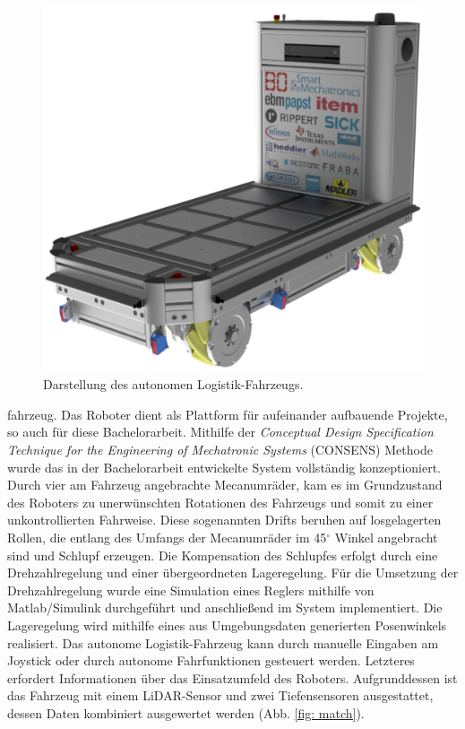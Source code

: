 \documentclass[12pt,a4paper,oneside,numbers=noenddot,headsepline,captions=tableheading,toc=bibliography,openany,tikz,margin=5mm]{scrbook}
\begin{document}
\begin{titlepage}
\begin{figure}
	\includegraphics[width=0.5\columnwidth]{alf2}
	\caption{Darstellung des autonomen Logistik-Fahrzeugs.}
	\label{fig: alf}
\end{figure}

 fahrzeug. Das Roboter dient als Plattform für aufeinander aufbauende Projekte, so auch für diese Bachelorarbeit. Mithilfe der \textit{Conceptual Design Specification Technique for the Engineering of Mechatronic Systems} (CONSENS) Methode wurde das in der Bachelorarbeit entwickelte System vollständig konzeptioniert. Durch vier am Fahrzeug angebrachte Mecanumräder, kam es im Grundzustand des Roboters zu unerwünschten Rotationen des Fahrzeugs und somit zu einer unkontrollierten Fahrweise. Diese sogenannten Drifts beruhen auf losgelagerten Rollen, die entlang des Umfangs der Mecanumräder im 45$^\circ$ Winkel angebracht sind und Schlupf erzeugen. Die Kompensation des Schlupfes erfolgt durch eine Drehzahlregelung und einer übergeordneten Lageregelung. Für die Umsetzung der Drehzahlregelung wurde eine Simulation eines Reglers mithilfe von Matlab/Simulink durchgeführt und anschließend im System implementiert. Die Lageregelung wird mithilfe eines aus Umgebungsdaten generierten Posenwinkels realisiert. Das autonome Logistik-Fahrzeug kann durch manuelle Eingaben am Joystick oder durch autonome Fahrfunktionen gesteuert werden. Letzteres erfordert Informationen über das Einsatzumfeld des Roboters. Aufgrunddessen ist das Fahrzeug mit einem LiDAR-Sensor und zwei Tiefensensoren ausgestattet, dessen Daten kombiniert ausgewertet werden (Abb. \ref{fig: match}).


\end{titlepage}
\end{document}
